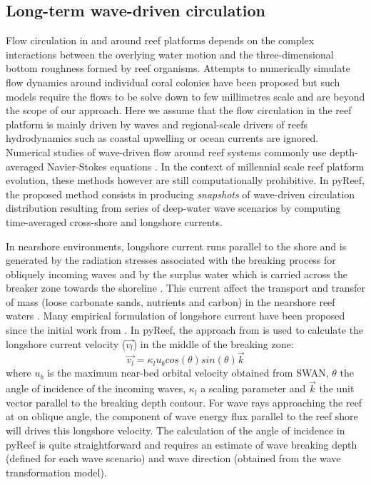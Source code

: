 \documentclass[default,jgrga]{agutex2015}
\begin{document}
\begin{article}
\subsection{Long-term wave-driven circulation}

Flow circulation in and around reef platforms depends on the complex interactions between the overlying water motion and the three-dimensional bottom roughness formed by reef organisms. Attempts to numerically simulate flow dynamics around individual coral colonies have been proposed \citep{Kaandorp03, Chang09, Chindapol13} but such models require the flows to be solve down to few millimetres scale and are beyond the scope of our approach. Here we assume that the flow circulation in the reef platform is mainly driven by waves and regional-scale drivers of reefs hydrodynamics such as coastal upwelling or ocean currents are ignored. Numerical studies of wave-driven flow around reef systems commonly use depth-averaged Navier-Stokes equations \citep{Raupach82, Symonds95, Lowe05, Lowe09, Pomeroy12, Taebi11}. In the context of millennial scale reef platform evolution, these methods however are still computationally prohibitive. In pyReef, the proposed method consists in producing \textit{snapshots} of wave-driven circulation distribution resulting from series of deep-water wave scenarios by computing time-averaged cross-shore and longshore currents.  

In nearshore environments, longshore current runs parallel to the shore and is generated by the radiation stresses associated with the breaking process for obliquely incoming waves and by the surplus water which is carried across the breaker zone towards the shoreline \citep{Longuet-Higgins70}. This current affect the transport and transfer of mass (loose carbonate sands, nutrients and carbon) in the nearshore reef waters \citep{Hamner88, Monismith07, Lowe15}. Many empirical formulation of longshore current have been proposed since the initial work from   \citet{Longuet-Higgins64}  \citep{Komar70, Komar75, Galvin87, Reniers97, Ruessink01, Grasmeijer03}. In pyReef, the approach from \citet{Komar75} is used to calculate the longshore current velocity ($\vec{v_l}$) in the middle of the breaking zone:
\begin{equation}
\vec{v_l} = \kappa_l u_{b} cos(\theta) sin(\theta) \vec{k}
\end{equation}
where $u_b$ is the maximum near-bed orbital velocity obtained from SWAN, $\theta$ the angle of incidence of the incoming waves, $\kappa_l$  a scaling parameter and $\vec{k}$ the unit vector parallel to the breaking depth contour. For wave rays approaching the reef at on oblique angle, the component of wave energy flux parallel to the reef shore will drives this longshore velocity. The calculation of the angle of incidence in pyReef is quite straightforward and requires an estimate of wave breaking depth (defined for each wave scenario) and wave direction (obtained from the wave transformation model). 


\end{article}
\end{document}
